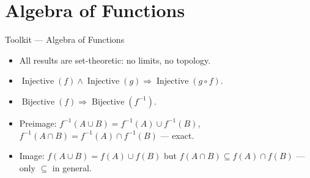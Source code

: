 \section{Algebra of Functions}

\begin{toolkitbox}{Toolkit --- Algebra of Functions}
\begin{itemize}
  \item All results are set-theoretic: no limits, no topology.
  \item $\operatorname{Injective}(f)\wedge\operatorname{Injective}(g)
    \Rightarrow\operatorname{Injective}(g\circ f)$.
  \item $\operatorname{Bijective}(f)\Rightarrow\operatorname{Bijective}(f^{-1})$.
  \item Preimage: $f^{-1}(A\cup B)=f^{-1}(A)\cup f^{-1}(B)$,
    $f^{-1}(A\cap B)=f^{-1}(A)\cap f^{-1}(B)$ --- exact.
  \item Image: $f(A\cup B)=f(A)\cup f(B)$ but
    $f(A\cap B)\subseteq f(A)\cap f(B)$ --- only $\subseteq$ in general.
\end{itemize}
\end{toolkitbox}


